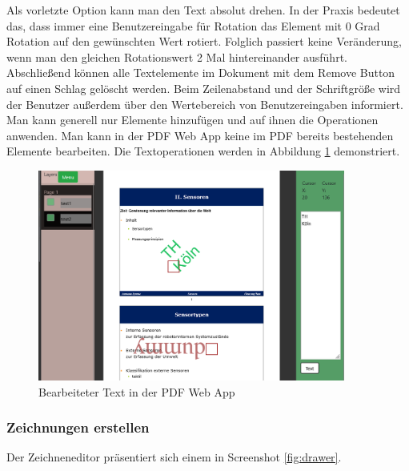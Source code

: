 Als vorletzte Option kann man den Text absolut drehen. In der Praxis bedeutet das, dass immer eine Benutzereingabe für Rotation das Element mit 0 Grad Rotation auf den gewünschten Wert rotiert. Folglich passiert keine Veränderung, wenn man den gleichen Rotationswert 2 Mal hintereinander ausführt. Abschließend können alle Textelemente im Dokument mit dem Remove Button auf einen Schlag gelöscht werden. Beim Zeilenabstand und der Schriftgröße wird der Benutzer außerdem über den Wertebereich von Benutzereingaben informiert. Man kann generell nur Elemente hinzufügen und auf ihnen die Operationen anwenden. Man kann in der PDF Web App keine im PDF bereits bestehenden Elemente bearbeiten. Die Textoperationen werden in Abbildung \ref{fig:text} demonstriert.

\begin{figure}[!htbp]
	\centering
	\includegraphics[width=0.9\textwidth]{"images/text.png"}
	\caption{Bearbeiteter Text in der PDF Web App}
	\label{fig:text}
\end{figure}

\subsubsection{Zeichnungen erstellen}
Der Zeichneneditor präsentiert sich einem in Screenshot \ref{fig:drawer}. 

